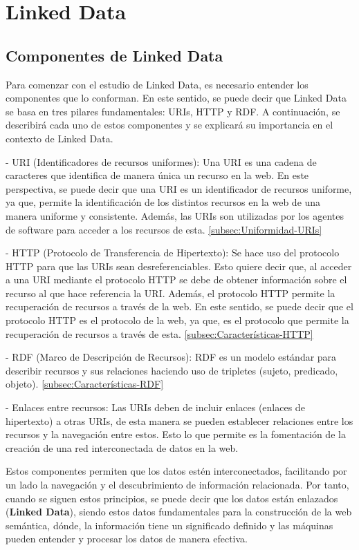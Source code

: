 \documentclass[11pt]{report}
\begin{document}
	\chapter{Linked Data}

	\section{Componentes de Linked Data}

	Para comenzar con el estudio de Linked Data, es necesario entender los componentes que lo conforman. En este sentido, se puede decir que Linked Data se basa en tres pilares fundamentales: URIs, HTTP y RDF. A continuación, se describirá cada uno de estos componentes y se explicará su importancia en el contexto de Linked Data.

- URI (Identificadores de recursos uniformes): Una URI es una cadena de caracteres que identifica de manera única un recurso en la web. En este perspectiva, se puede decir que una URI es un identificador de recursos uniforme, ya que, permite la identificación de los distintos recursos en la web de una manera uniforme y consistente. Además, las URIs son utilizadas por los agentes de software para acceder a los recursos de esta. \ref{subsec:Uniformidad-URIs}

- HTTP (Protocolo de Transferencia de Hipertexto): Se hace uso del protocolo HTTP para que las URIs sean desreferenciables. Esto quiere decir que, al acceder a una URI mediante el protocolo HTTP se debe de obtener información sobre el recurso al que hace referencia la URI. Además, el protocolo HTTP permite la recuperación de recursos a través de la web. En este sentido, se puede decir que el protocolo HTTP es el protocolo de la web, ya que, es el protocolo que permite la recuperación de recursos a través de esta. \ref{subsec:Características-HTTP}

- RDF (Marco de Descripción de Recursos): RDF es un modelo estándar para describir recursos y sus relaciones haciendo uso de tripletes (sujeto, predicado, objeto). \ref{subsec:Características-RDF}

- Enlaces entre recursos: Las URIs deben de incluir enlaces (enlaces de hipertexto) a otras URIs, de esta manera se pueden establecer relaciones entre los recursos y la navegación entre estos. Esto lo que permite es la fomentación de la creación de una red interconectada de datos en la web.

Estos componentes permiten que los datos estén interconectados, facilitando por un lado la navegación y el descubrimiento de información relacionada. Por tanto, cuando se siguen estos principios, se puede decir que los datos están enlazados (\textbf{Linked Data}), siendo estos datos fundamentales para la construcción de la web semántica, dónde, la información tiene un significado definido y las máquinas pueden entender y procesar los datos de manera efectiva.
\end{document}
